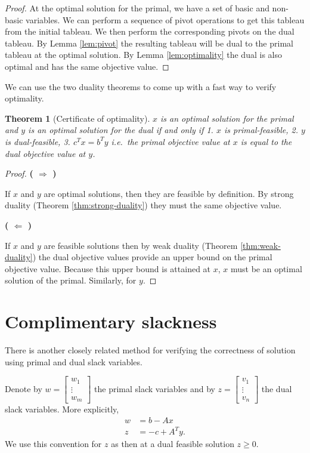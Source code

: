 \documentclass[
]{book}
\newtheorem{theorem}{Theorem}[chapter]
\theoremstyle{definition}
\theoremstyle{definition}
\theoremstyle{definition}
\theoremstyle{definition}
\theoremstyle{remark}
\begin{document}
\begin{proof}
At the optimal solution for the primal, we have a set of basic and non-basic variables. We can perform a sequence of pivot operations to get this tableau from the initial tableau. We then perform the corresponding pivots on the dual tableau. By Lemma \ref{lem:pivot} the resulting tableau will be dual to the primal tableau at the optimal solution. By Lemma \ref{lem:optimality} the dual is also optimal and has the same objective value.
\end{proof}

We can use the two duality theorems to come up with a fast way to verify optimality.

\begin{theorem}[Certificate of optimality]
\protect\hypertarget{thm:certificate-of-optimality}{}\label{thm:certificate-of-optimality}\(x\) is an optimal solution for the primal and \(y\) is an optimal solution for the dual if and only if
1. \(x\) is primal-feasible,
2. \(y\) is dual-feasible,
3. \(c^T x = b^T y\) i.e.~the primal objective value at \(x\) is equal to the dual objective value at \(y\).
\end{theorem}

\begin{proof}
\textbf{( \(\Rightarrow\) )}

If \(x\) and \(y\) are optimal solutions, then they are feasible by definition. By strong duality (Theorem \ref{thm:strong-duality}) they must the same objective value.

\textbf{( \(\Leftarrow\) )}

If \(x\) and \(y\) are feasible solutions then by weak duality (Theorem \ref{thm:weak-duality}) the dual objective values provide an upper bound on the primal objective value. Because this upper bound is attained at \(x\), \(x\) must be an optimal solution of the primal. Similarly, for \(y\).
\end{proof}

\hypertarget{complimentary-slackness}{%
\section{Complimentary slackness}\label{complimentary-slackness}}

There is another closely related method for verifying the correctness of solution using primal and dual slack variables.

Denote by \(w = \begin{bmatrix} w_1 \\ \vdots \\ w_m \end{bmatrix}\) the primal slack variables and by \(z = \begin{bmatrix} v_1 \\ \vdots \\ v_n \end{bmatrix}\) the dual slack variables.
More explicitly,
\begin{align*}
  w &= b - A x \\ 
  z &= -c + A^T y.  
\end{align*}
We use this convention for \(z\) as then at a dual feasible solution \(z \ge 0\).
\end{document}
